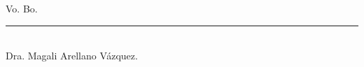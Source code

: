 \documentclass[12pt,oneside,article]{memoir}
\begin{document}
\clearpage

\renewcommand\bibname{Referencias}




\bigskip
\begin{center}
    Vo. Bo.

    \bigskip
\rule{7cm}{0.4pt}\\
    Dra. Magali Arellano Vázquez.
\end{center}
\end{document}
